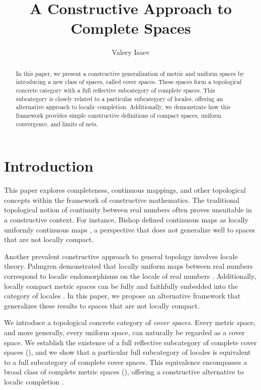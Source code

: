 \documentclass[reqno]{amsart}
\theoremstyle{definition}
\theoremstyle{remark}
\numberwithin{figure}{section}
\begin{document}
\title{A Constructive Approach to Complete Spaces}

\author{Valery Isaev}

\begin{abstract}
In this paper, we present a constructive generalization of metric and uniform spaces by introducing a new class of spaces, called cover spaces.
These spaces form a topological concrete category with a full reflective subcategory of complete spaces.
This subcategory is closely related to a particular subcategory of locales, offering an alternative approach to localic completion.
Additionally, we demonstrate how this framework provides simple constructive definitions of compact spaces, uniform convergence, and limits of nets.
\end{abstract}

\maketitle

\section{Introduction}

This paper explores completeness, continuous mappings, and other topological concepts within the framework of constructive mathematics.
The traditional topological notion of continuity between real numbers often proves unsuitable in a constructive context.
For instance, Bishop defined continuous maps as locally uniformly continuous maps \cite[Chapter 2, Definition 9]{bishop},
a perspective that does not generalize well to spaces that are not locally compact.

Another prevalent constructive approach to general topology involves locale theory.
Palmgren demonstrated that locally uniform maps between real numbers correspond to localic endomorphisms on the locale of real numbers \cite{palmgren-cont}.
Additionally, locally compact metric spaces can be fully and faithfully embedded into the category of locales \cite{palmgren-metric-locales}.
In this paper, we propose an alternative framework that generalizes these results to spaces that are not locally compact.

We introduce a topological concrete category of \emph{cover spaces}.
Every metric space, and more generally, every uniform space, can naturally be regarded as a cover space.
We establish the existence of a full reflective subcategory of complete cover spaces (),
and we show that a particular full subcategory of locales is equivalent to a full subcategory of complete cover spaces.
This equivalence encompasses a broad class of complete metric spaces (),
offering a constructive alternative to localic completion \cite{localic-completion}.
\end{document}
